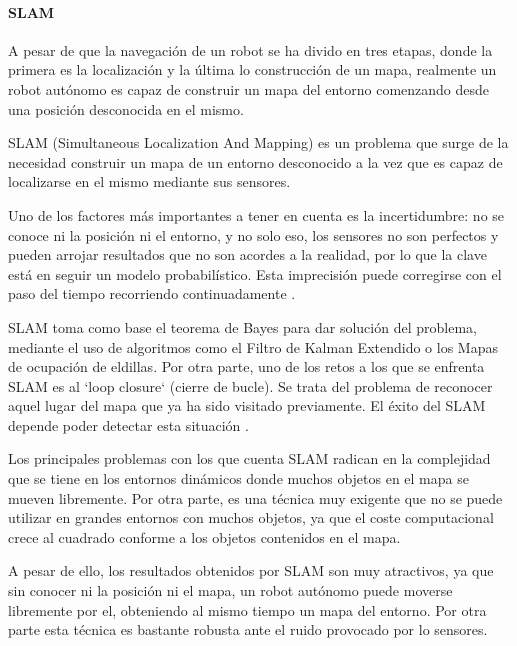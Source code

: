 \paragraph{SLAM} \hspace{0pt}

A pesar de que la navegación de un robot se ha divido en tres etapas, donde la
primera es la localización y la última lo construcción de un mapa, realmente un
robot autónomo es capaz de construir un mapa del entorno comenzando desde una
posición desconocida en el mismo.

SLAM (Simultaneous Localization And Mapping) es un problema que surge de la
necesidad construir un mapa de un entorno desconocido a la vez que es capaz de
localizarse en el mismo mediante sus sensores. 

Uno de los factores más importantes a tener en cuenta es la incertidumbre: no se
conoce ni la posición ni el entorno, y no solo eso, los sensores no son
perfectos y pueden arrojar resultados que no son acordes a la realidad,  por lo
que la clave está en seguir un modelo probabilístico. Esta imprecisión puede
corregirse con el paso del tiempo recorriendo continuadamente \cite{Slam}.


SLAM toma como base el teorema de Bayes para dar solución del problema, mediante
el uso de algoritmos como el Filtro de Kalman Extendido o los Mapas de ocupación
de eldillas. Por otra parte, uno de los retos a los que se enfrenta SLAM es al
`loop closure` (cierre de bucle). Se trata del problema de reconocer aquel lugar
del mapa que ya ha sido visitado previamente. El éxito del SLAM depende poder
detectar esta situación \cite{Bayes}.

Los principales problemas con los que cuenta SLAM radican en la complejidad que
se tiene en los entornos dinámicos donde muchos objetos en el mapa se mueven
libremente. Por otra parte, es una técnica muy exigente que no se puede utilizar
en grandes entornos con muchos objetos, ya que el coste computacional crece al
cuadrado conforme a los objetos contenidos en el mapa.

A pesar de ello, los resultados obtenidos por SLAM son muy atractivos, ya que
sin conocer ni la posición ni el mapa, un robot autónomo puede moverse
libremente por el, obteniendo al mismo tiempo un mapa del entorno. Por otra
parte esta técnica es bastante robusta ante el ruido provocado por lo sensores.

